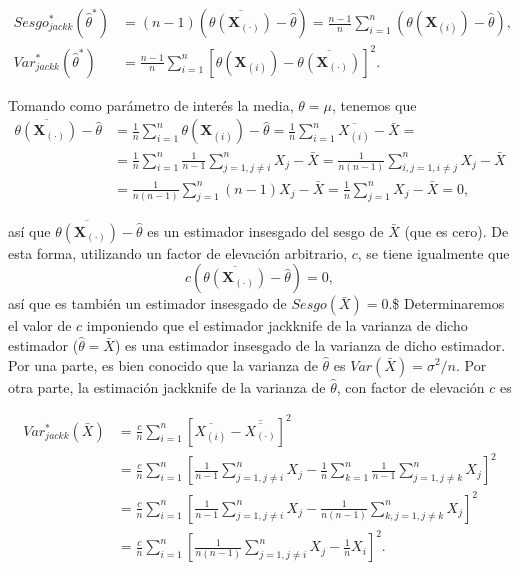 \documentclass[
]{book}
\theoremstyle{definition}
\theoremstyle{definition}
\theoremstyle{definition}
\theoremstyle{remark}
\begin{document}
\[\begin{aligned}
Sesgo_{jackk}^{\ast}\left( \hat{\theta}^{\ast} \right) &= \left( n-1 \right)
\left( \overline{\theta \left( \mathbf{X}_{(\cdot)}
 \right)}-\hat{\theta} \right) =\frac{n-1}{n}\sum_{i=1}^{n}\left( \theta
\left( \mathbf{X}_{(i)} \right) -\hat{\theta} \right), \\
Var_{jackk}^{\ast}\left( \hat{\theta}^{\ast} \right) &= \frac{n-1}{n}
\sum_{i=1}^{n}\left[ \theta \left( \mathbf{X}_{(i)}
 \right) -\overline{\theta \left( \mathbf{X}_{(\cdot)}
 \right)}\right]^2.
\end{aligned}\]

Tomando como parámetro de interés la media, \(\theta =\mu\), tenemos que
\[\begin{aligned}
\overline{\theta \left( \mathbf{X}_{(\cdot)} \right)}-
\hat{\theta} &= \frac{1}{n}\sum_{i=1}^{n}\theta \left( 
\mathbf{X}_{(i)} \right) -\hat{\theta}=\frac{1}{n}\sum_{i=1}^{n}
\overline{X_{(i)}}-\bar{X}= \\
&= \frac{1}{n}\sum_{i=1}^{n}\frac{1}{n-1}\sum_{j=1,j\neq i}^{n}X_j-
\bar{X}=\frac{1}{n\left( n-1 \right)}\sum_{i,j=1,i\neq j}^{n}X_j-
\bar{X} \\
&= \frac{1}{n\left( n-1 \right)}\sum_{j=1}^{n}\left( n-1 \right) X_j-
\bar{X}=\frac{1}{n}\sum_{j=1}^{n}X_j-\bar{X}=0,\end{aligned}\]

así que \(\overline{\theta \left( \mathbf{X}_{(\cdot)} \right)}-\hat{\theta}\) es un estimador insesgado del sesgo de
\(\bar{X}\) (que es cero). De esta forma, utilizando un factor de
elevación arbitrario, \(c\), se tiene igualmente que
\[c\left( \overline{\theta \left( \mathbf{X}_{(\cdot)} \right)}
- \hat{\theta} \right) = 0,\]
así que es también un estimador insesgado de
\(Sesgo\left( \bar{X} \right) =0.\)\$
Determinaremos el valor de \(c\)
imponiendo que el estimador jackknife de la varianza de dicho estimador
(\(\hat{\theta}=\bar{X}\)) es una estimador insesgado de la varianza de
dicho estimador. Por una parte, es bien conocido que la varianza de
\(\hat{\theta}\) es \(Var\left( \bar{X} \right) = \sigma^2 /n\).
Por otra parte, la estimación jackknife de la varianza de \(\hat{\theta}\),
con factor de elevación \(c\) es

\[\begin{aligned}
Var_{jackk}^{\ast}\left( \bar{X} \right) &= \frac{c}{n}\sum_{i=1}^{n}
\left[ \overline{X_{(i)}}-\overline{\overline{X_{\left( \cdot
 \right)}}}\right]^2 \\
&= \frac{c}{n}\sum_{i=1}^{n}\left[ \frac{1}{n-1}\sum_{j=1,j\neq i}^{n}X_j-
\frac{1}{n}\sum_{k=1}^{n}\frac{1}{n-1}\sum_{j=1,j\neq k}^{n}X_j\right]^2
\\
&= \frac{c}{n}\sum_{i=1}^{n}\left[ \frac{1}{n-1}\sum_{j=1,j\neq i}^{n}X_j-
\frac{1}{n\left( n-1 \right)}\sum_{k,j=1,j\neq k}^{n}X_j\right]^2 \\
&= \frac{c}{n}\sum_{i=1}^{n}\left[ \frac{1}{n\left( n-1 \right)}
\sum_{j=1,j\neq i}^{n}X_j-\frac{1}{n}X_i\right]^2.\end{aligned}\]
\end{document}
